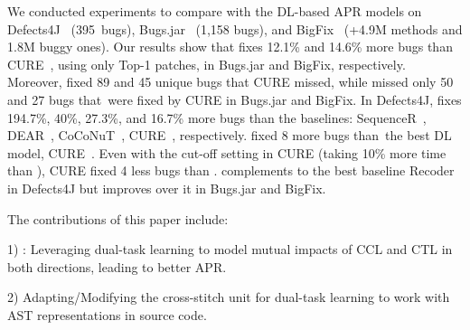 We conducted experiments to compare {\tool} with the DL-based APR
models on Defects4J~\cite{defects4j} (395~bugs),
Bugs.jar~\cite{saha2018bugs} (1,158 bugs), and
BigFix~\cite{yioopsla19} (+4.9M methods and 1.8M buggy ones). Our
results show that {\tool} fixes 12.1\% and 14.6\% more bugs than
CURE~\cite{cure-icse21}, using only Top-1 patches, in Bugs.jar and
BigFix, respectively. Moreover, {\tool} fixed 89 and 45 unique bugs
that CURE missed, while {\tool} missed only 50 and 27 bugs that~were
fixed by CURE in Bugs.jar and BigFix. In Defects4J, {\tool} fixes
194.7\%, 40\%, 27.3\%, and 16.7\% more bugs than the baselines:
SequenceR~\cite{chen2018sequencer}, DEAR~\cite{icse22},
CoCoNuT~\cite{lutellier2020coconut}, CURE~\cite{cure-icse21},
respectively.  {\tool} fixed 8 more bugs than~the best DL model,
CURE~\cite{cure-icse21}.  Even with the cut-off setting in CURE
(taking 10\% more time than {\tool}), CURE fixed 4 less bugs than
{\tool}. {\tool} complements to the best baseline Recoder in Defects4J
but improves over it in Bugs.jar and BigFix.

The contributions of this paper include:





1) {\tool}: Leveraging dual-task learning to model mutual impacts of
CCL and CTL in both directions, leading to better APR.


2) Adapting/Modifying the cross-stitch unit for dual-task
learning to work with AST representations in source code.





